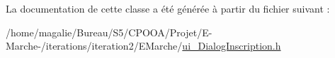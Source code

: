 La documentation de cette classe a été générée à partir du fichier suivant \-:\begin{DoxyCompactItemize}
\item 
/home/magalie/\-Bureau/\-S5/\-C\-P\-O\-O\-A/\-Projet/\-E-\/\-Marche-\//iterations/iteration2/\-E\-Marche/\hyperlink{ui___dialog_inscription_8h}{ui\-\_\-\-Dialog\-Inscription.\-h}\end{DoxyCompactItemize}
